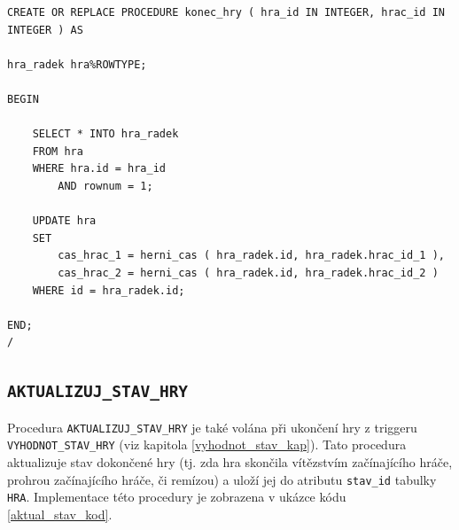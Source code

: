\documentclass[
11pt,
a4paper,
pdftex,
czech,
titlepage
]{report}
\begin{document}
\renewcommand{\lstlistingname}{Ukázka kódu}
\begin{lstlisting}
CREATE OR REPLACE PROCEDURE konec_hry ( hra_id IN INTEGER, hrac_id IN INTEGER ) AS

hra_radek hra%ROWTYPE;
    
BEGIN

    SELECT * INTO hra_radek 
    FROM hra 
    WHERE hra.id = hra_id
        AND rownum = 1;
        
    UPDATE hra
    SET 
        cas_hrac_1 = herni_cas ( hra_radek.id, hra_radek.hrac_id_1 ),
        cas_hrac_2 = herni_cas ( hra_radek.id, hra_radek.hrac_id_2 )
    WHERE id = hra_radek.id;

END;
/
\end{lstlisting}

\subsection{\texttt{AKTUALIZUJ\_STAV\_HRY}}\label{aktual_stav_kap}
\begin{sloppypar}
Procedura \texttt{AKTUALIZUJ\_STAV\_HRY} je také volána při ukončení hry z triggeru \texttt{VYHODNOT\_STAV\_HRY} (viz kapitola \ref{vyhodnot_stav_kap}). Tato procedura aktualizuje stav dokončené hry (tj. zda hra skončila vítězstvím začínajícího hráče, prohrou začínajícího hráče, či remízou) a uloží jej do atributu \texttt{stav\_id} tabulky \texttt{HRA}. Implementace této procedury je zobrazena v ukázce kódu \ref{aktual_stav_kod}.
\end{sloppypar}
\end{document}

